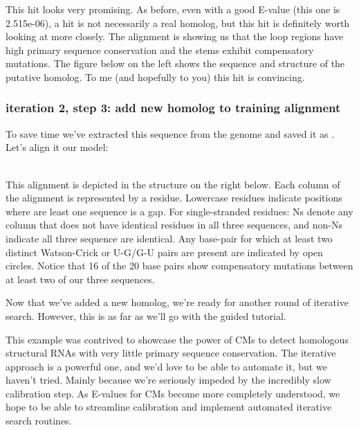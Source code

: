 This hit looks very promising. As before, even with a good E-value
(this one is 2.515e-06), a hit is not necessarily a real homolog, but
this hit is definitely worth looking at more closely. The
 alignment is showing us that the loop regions have
high primary sequence conservation and the stems exhibit
compensatory mutations. The figure below on the left shows the
sequence and structure of the putative homolog. To me (and hopefully to you) this
hit is convincing. 

\subsubsection{iteration 2, step 3: add new homolog to training alignment}
To save time we've extracted this sequence from the genome and saved
it as . Let's align it our model:

\\

This alignment is depicted in the structure on the right below. Each
column of the alignment is represented by a residue. Lowercase
residues indicate positions where are least one sequence is a gap.
For single-stranded residues: Ns denote any column that does not have
identical residues in all three sequences, and non-Ns indicate all
three sequence are identical. Any base-pair for which at least two
distinct Watson-Crick or U-G/G-U pairs are present are indicated by
open circles. Notice that 16 of the 20 base pairs show compensatory
mutations between at least two of our three sequences.

Now that we've added a new homolog, we're ready for another round of
iterative search. However, this is as far as we'll go with the guided
tutorial. 

This example was contrived to showcase the power of CMs to detect
homologous structural RNAs with very little primary sequence
conservation. The iterative approach is a powerful one, and we'd love
to be able to automate it, but we haven't tried. Mainly because we're
seriously impeded by the incredibly slow calibration step. As E-values
for CMs become more completely understood, we hope to be able to
streamline calibration and implement automated iterative search
routines. 

